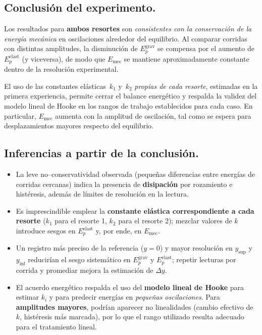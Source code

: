 \documentclass[11pt,twocolumn]{article}
\begin{document}
\subsection{Conclusión del experimento.}

Los resultados para \textbf{ambos resortes} son \emph{consistentes con la conservación de la energía mecánica} en oscilaciones alrededor del equilibrio. Al comparar corridas con distintas amplitudes, la disminución de $E_p^{\text{grav}}$ se compensa por el aumento de $E_p^{\text{elast}}$ (y viceversa), de modo que $E_{\text{mec}}$ se mantiene aproximadamente constante dentro de la resolución experimental.

El uso de las constantes elásticas \(\,k_1\) y \(\,k_2\) \emph{propias de cada resorte}, estimadas en la primera experiencia, permite cerrar el balance energético y respalda la validez del modelo lineal de Hooke en los rangos de trabajo establecidos para cada caso. En particular, $E_{\text{mec}}$ aumenta con la amplitud de oscilación, tal como se espera para desplazamientos mayores respecto del equilibrio.

\subsection{Inferencias a partir de la conclusión.}
\begin{itemize}[leftmargin=*,itemsep=2pt,topsep=2pt]
    \item La leve no–conservatividad observada (pequeñas diferencias entre energías de corridas cercanas) indica la presencia de \textbf{disipación} por rozamiento e histéresis, además de límites de resolución en la lectura.
    \item Es imprescindible emplear la \textbf{constante elástica correspondiente a cada resorte} (\(k_1\) para el resorte 1, \(k_2\) para el resorte 2); mezclar valores de \(k\) introduce sesgos en $E_p^{\text{elast}}$ y, por ende, en $E_{\text{mec}}$.
    \item Un registro más preciso de la referencia ($y=0$) y mayor resolución en $y_{\text{sup}}$ y $y_{\text{inf}}$ reducirían el sesgo sistemático en $E_p^{\text{grav}}$ y $E_p^{\text{elast}}$; repetir lecturas por corrida y promediar mejora la estimación de \(\Delta y\).
    \item El acuerdo energético respalda el uso del \textbf{modelo lineal de Hooke} para estimar \(k_i\) y para predecir energías en \emph{pequeñas oscilaciones}. Para \textbf{amplitudes mayores}, podrían aparecer no linealidades (cambio efectivo de \(k\), histéresis más marcada), por lo que el rango utilizado resulta adecuado para el tratamiento lineal.
\end{itemize}
\end{document}
